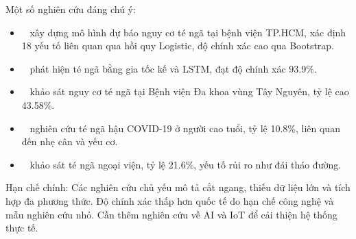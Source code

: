 Một số nghiên cứu đáng chú ý:
\begin{itemize}
    \item ~\cite{nguyen2024} xây dựng mô hình dự báo nguy cơ té ngã tại bệnh viện TP.HCM, xác định 18 yếu tố liên quan qua hồi quy Logistic, độ chính xác cao qua Bootstrap.  
    \item ~\cite{tran2017} phát hiện té ngã bằng gia tốc kế và LSTM, đạt độ chính xác 93.9\%.  
    \item ~\cite{phan2022} khảo sát nguy cơ té ngã tại Bệnh viện Đa khoa vùng Tây Nguyên, tỷ lệ cao 43.58\%.  
    \item ~\cite{nguyen2023} nghiên cứu té ngã hậu COVID-19 ở người cao tuổi, tỷ lệ 10.8\%, liên quan đến nhẹ cân và yếu cơ.  
    \item ~\cite{trinh2023} khảo sát té ngã ngoại viện, tỷ lệ 21.6\%, yếu tố rủi ro như đái tháo đường.
\end{itemize}

Hạn chế chính: Các nghiên cứu chủ yếu mô tả cắt ngang, thiếu dữ liệu lớn và tích hợp đa phương thức. Độ chính xác thấp hơn quốc tế do hạn chế công nghệ và mẫu nghiên cứu nhỏ. Cần thêm nghiên cứu về AI và IoT để cải thiện hệ thống thực tế.
